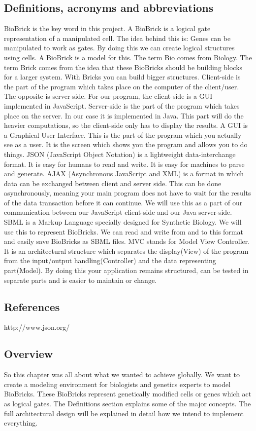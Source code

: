 \documentclass[a4paper]{article}
\begin{document}
\subsection{Definitions, acronyms and abbreviations}
BioBrick is the key word in this project. A BioBrick is a logical gate representation of a manipulated cell. The idea behind this is: Genes can be manipulated to work as gates. By doing this we can create logical structures using cells. A BioBrick is a model for this. The term Bio comes from Biology. The term Brick comes from the idea that these BioBricks should be building blocks for a larger system. With Bricks you can build bigger structures. 
Client-side is the part of the program which takes place on the computer of the client/user. The opposite is server-side. For our program, the client-side is a GUI implemented in JavaScript. 
Server-side is the part of the program which takes place on the server. In our case it is implemented in Java. This part will do the heavier computations, so the client-side only has to display the results.
A GUI is a Graphical User Interface. This is the part of the program which you actually see as a user. It is the screen which shows you the program and allows you to do things. 
JSON (JavaScript Object Notation) is a lightweight data-interchange format. It is easy for humans to read and write. It is easy for machines to parse and generate.
AJAX (Asynchronous JavaScript and XML) is a format in which data can be exchanged between client and server side. This can be done asynchronously, meaning your main program does not have to wait for the results of the data transaction before it can continue. We will use this as a part of our communication between our JavaScript client-side and our Java server-side.
SBML is a Markup Language specially designed for Synthetic Biology. We will use this to represent BioBricks. We can read and write from and to this format and easily save BioBricks as SBML files.
MVC stands for Model View Controller. It is an architectural structure which separates the display(View) of the program from the input/output handling(Controller) and the data representing part(Model). By doing this your application remains structured, can be tested in separate parts and is easier to maintain or change.
\subsection{References}
http://www.json.org/
\subsection{Overview}
So this chapter was all about what we wanted to achieve globally. We want to create a modeling environment for biologists and genetics experts to model BioBricks. These BioBricks represent genetically modified cells or genes which act as logical gates. The Definitions section explains some of the major concepts. The full architectural design will be explained in detail how we intend to implement everything.
\end{document}
